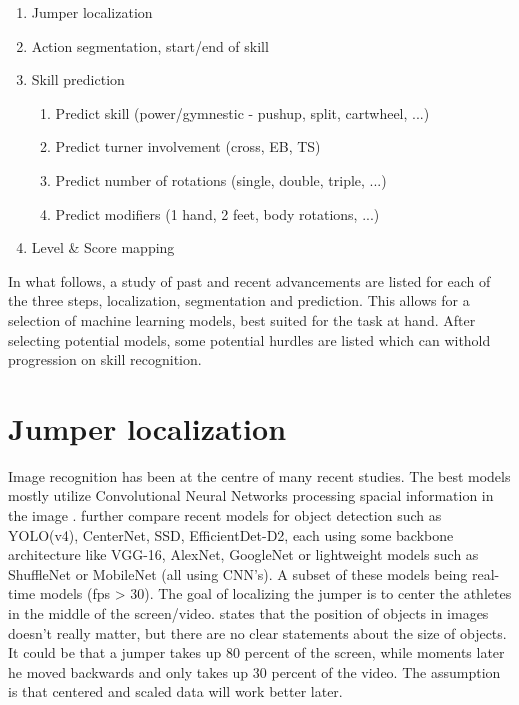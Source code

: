 \begin{enumerate}
    \item Jumper localization
    \item Action segmentation, start/end of skill
    \item Skill prediction
    \begin{enumerate}
        \item Predict skill (power/gymnestic - pushup, split, cartwheel, ...)
        \item Predict turner involvement (cross, EB, TS)
        \item Predict number of rotations (single, double, triple, ...)
        \item Predict modifiers (1 hand, 2 feet, body rotations, ...)
    \end{enumerate}
    \item Level \& Score mapping
\end{enumerate}

In what follows, a study of past and recent advancements are listed for each of the three steps, localization, segmentation and prediction. This allows for a selection of machine learning models, best suited for the task at hand. After selecting potential models, some potential hurdles are listed which can withold progression on skill recognition.

\section{Jumper localization}
\label{lit:jumper-localization}

Image recognition has been at the centre of many recent studies. The best models mostly utilize Convolutional Neural Networks processing spacial information in the image \autocite{Zaidi_2021}. \textcite{Zaidi_2021} further compare recent models for object detection such as YOLO(v4), CenterNet, SSD, EfficientDet-D2, each using some backbone architecture like VGG-16, AlexNet, GoogleNet or lightweight models such as ShuffleNet or MobileNet (all using CNN's). A subset of these models being real-time models (fps > 30).
The goal of localizing the jumper is to center the athletes in the middle of the screen/video. \textcite{Bharadiya_2023} states that the position of objects in images doesn't really matter, but there are no clear statements about the size of objects. It could be that a jumper takes up 80 percent of the screen, while moments later he moved backwards and only takes up 30 percent of the video. The assumption is that centered and scaled data will work better later.

